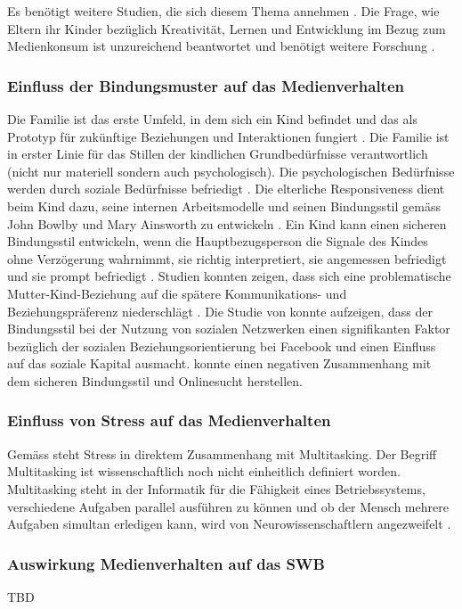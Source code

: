 Es benötigt weitere Studien, die sich diesem Thema annehmen \cite{Wartella2016}. Die Frage, wie Eltern ihr Kinder bezüglich Kreativität, Lernen und Entwicklung im Bezug zum Medienkonsum ist unzureichend beantwortet und benötigt weitere Forschung \cite{AmericanAcademyofPediatrics2011,Troseth2016}. 
\subsubsection{Einfluss der Bindungsmuster auf das Medienverhalten} 
Die Familie ist das erste Umfeld, in dem sich ein Kind befindet  und das als Prototyp für zukünftige Beziehungen und Interaktionen fungiert \cite{Floros2013}. Die Familie ist in erster Linie für das Stillen der kindlichen Grundbedürfnisse verantwortlich (nicht nur materiell sondern auch psychologisch). Die psychologischen Bedürfnisse werden durch soziale Bedürfnisse befriedigt \cite{Hazan1994}. Die elterliche Responsiveness dient beim Kind dazu, seine internen Arbeitsmodelle und seinen Bindungsstil gemäss John Bowlby und Mary Ainsworth zu entwickeln \cite{Bretherton1999}. Ein Kind kann einen sicheren Bindungsstil entwickeln, wenn die Hauptbezugsperson die Signale des Kindes ohne Verzögerung wahrnimmt, sie richtig interpretiert, sie angemessen befriedigt und sie prompt befriedigt \cite{Bell1972}. Studien konnten zeigen, dass sich eine problematische Mutter-Kind-Beziehung auf die spätere Kommunikations- und Beziehungspräferenz niederschlägt \cite{Szwedo2011}. Die Studie von  konnte aufzeigen, dass der Bindungsstil bei der Nutzung von sozialen Netzwerken einen signifikanten Faktor bezüglich der sozialen Beziehungsorientierung bei Facebook und einen Einfluss auf das soziale Kapital ausmacht.  konnte einen negativen Zusammenhang mit dem sicheren Bindungsstil und Onlinesucht herstellen.  
\subsubsection{Einfluss von Stress auf das Medienverhalten}
Gemäss  steht Stress in direktem Zusammenhang mit Multitasking. Der Begriff Multitasking ist wissenschaftlich noch nicht einheitlich definiert worden. Multitasking steht in der Informatik für die Fähigkeit eines Betriebssystems, verschiedene Aufgaben parallel ausführen zu können  und ob der Mensch mehrere Aufgaben simultan erledigen kann, wird von Neurowissenschaftlern angezweifelt \cite{Zimber2016}. 
 
\subsubsection{Auswirkung Medienverhalten auf das SWB}
TBD

